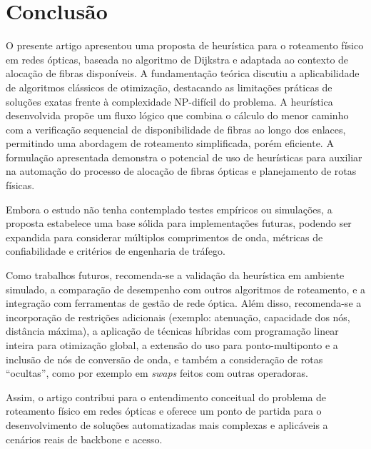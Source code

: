 \section{Conclusão} \label{sec:conclusion}

O presente artigo apresentou uma proposta de heurística para o roteamento
físico em redes ópticas, baseada no algoritmo de Dijkstra e adaptada ao
contexto de alocação de fibras disponíveis. A fundamentação teórica discutiu a
aplicabilidade de algoritmos clássicos de otimização, destacando as limitações
práticas de soluções exatas frente à complexidade NP-difícil do problema. A
heurística desenvolvida propõe um fluxo lógico que combina o cálculo do menor
caminho com a verificação sequencial de disponibilidade de fibras ao longo dos
enlaces, permitindo uma abordagem de roteamento simplificada, porém eficiente.
A formulação apresentada demonstra o potencial de uso de heurísticas para
auxiliar na automação do processo de alocação de fibras ópticas e
planejamento de rotas físicas.

Embora o estudo não tenha contemplado testes empíricos ou simulações, a
proposta estabelece uma base sólida para implementações futuras, podendo ser
expandida para considerar múltiplos comprimentos de onda, métricas de
confiabilidade e critérios de engenharia de tráfego.

Como trabalhos futuros, recomenda-se a validação da heurística em ambiente
simulado, a comparação de desempenho com outros algoritmos de roteamento, e a
integração com ferramentas de gestão de rede óptica. Além disso, recomenda-se a
incorporação de restrições adicionais (exemplo: atenuação, capacidade dos nós,
distância máxima), a aplicação de técnicas híbridas com programação linear
inteira para otimização global, a extensão do uso para ponto-multiponto e a
inclusão de nós de conversão de onda, e também a consideração de rotas
\enquote{ocultas}, como por exemplo em \textit{swaps} feitos com outras operadoras.

Assim, o artigo contribui para o entendimento
conceitual do problema de roteamento físico em redes ópticas e oferece um ponto
de partida para o desenvolvimento de soluções automatizadas mais complexas e
aplicáveis a cenários reais de backbone e acesso.


